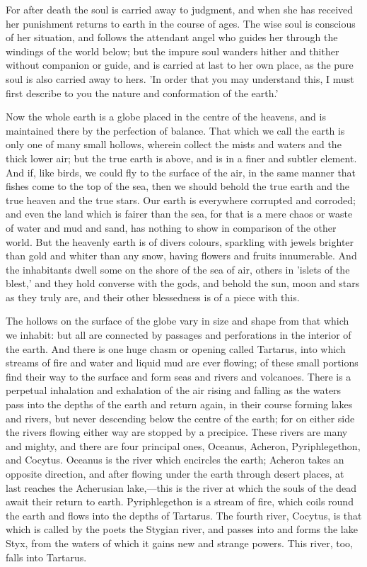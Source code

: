 \documentclass[11pt,letter]{article}
\begin{document}
\par  For after death the soul is carried away to judgment, and when she has received her punishment returns to earth in the course of ages. The wise soul is conscious of her situation, and follows the attendant angel who guides her through the windings of the world below; but the impure soul wanders hither and thither without companion or guide, and is carried at last to her own place, as the pure soul is also carried away to hers. 'In order that you may understand this, I must first describe to you the nature and conformation of the earth.'

\par  Now the whole earth is a globe placed in the centre of the heavens, and is maintained there by the perfection of balance. That which we call the earth is only one of many small hollows, wherein collect the mists and waters and the thick lower air; but the true earth is above, and is in a finer and subtler element. And if, like birds, we could fly to the surface of the air, in the same manner that fishes come to the top of the sea, then we should behold the true earth and the true heaven and the true stars. Our earth is everywhere corrupted and corroded; and even the land which is fairer than the sea, for that is a mere chaos or waste of water and mud and sand, has nothing to show in comparison of the other world. But the heavenly earth is of divers colours, sparkling with jewels brighter than gold and whiter than any snow, having flowers and fruits innumerable. And the inhabitants dwell some on the shore of the sea of air, others in 'islets of the blest,' and they hold converse with the gods, and behold the sun, moon and stars as they truly are, and their other blessedness is of a piece with this.

\par  The hollows on the surface of the globe vary in size and shape from that which we inhabit: but all are connected by passages and perforations in the interior of the earth. And there is one huge chasm or opening called Tartarus, into which streams of fire and water and liquid mud are ever flowing; of these small portions find their way to the surface and form seas and rivers and volcanoes. There is a perpetual inhalation and exhalation of the air rising and falling as the waters pass into the depths of the earth and return again, in their course forming lakes and rivers, but never descending below the centre of the earth; for on either side the rivers flowing either way are stopped by a precipice. These rivers are many and mighty, and there are four principal ones, Oceanus, Acheron, Pyriphlegethon, and Cocytus. Oceanus is the river which encircles the earth; Acheron takes an opposite direction, and after flowing under the earth through desert places, at last reaches the Acherusian lake,—this is the river at which the souls of the dead await their return to earth. Pyriphlegethon is a stream of fire, which coils round the earth and flows into the depths of Tartarus. The fourth river, Cocytus, is that which is called by the poets the Stygian river, and passes into and forms the lake Styx, from the waters of which it gains new and strange powers. This river, too, falls into Tartarus.
\end{document}
